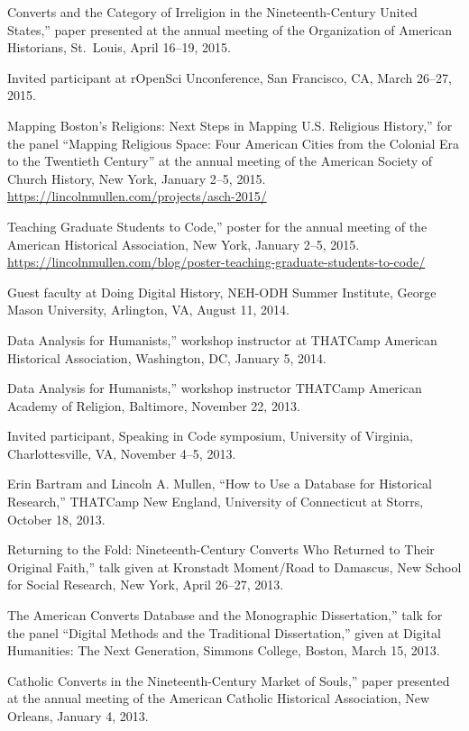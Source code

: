 \documentclass[11pt]{article}
\begin{document}
\noindent{}Converts and the Category of Irreligion in the Nineteenth-Century United States,'' paper presented at the annual meeting of the Organization of American Historians, St.~Louis, April 16--19, 2015.

Invited participant at rOpenSci Unconference, San Francisco, CA, March 26--27, 2015.

\noindent{}Mapping Boston's Religions: Next Steps in Mapping U.S. Religious History,'' for the panel ``Mapping Religious Space: Four American Cities from the Colonial Era to the Twentieth Century'' at the annual meeting of the American Society of Church History, New York, January 2--5, 2015.  
\url{https://lincolnmullen.com/projects/asch-2015/}

\noindent{}Teaching Graduate Students to Code,'' poster for the annual meeting of the American Historical Association, New York, January 2--5, 2015.  \url{https://lincolnmullen.com/blog/poster-teaching-graduate-students-to-code/}

Guest faculty at Doing Digital History, NEH-ODH Summer Institute, George Mason University, Arlington, VA, August 11, 2014.

\noindent{}Data Analysis for Humanists,'' workshop instructor at THATCamp American Historical Association, Washington, DC, January 5, 2014.

\noindent{}Data Analysis for Humanists,'' workshop instructor THATCamp American Academy of Religion, Baltimore, November 22, 2013.

Invited participant, Speaking in Code symposium, University of Virginia, Charlottesville, VA, November 4--5, 2013.

Erin Bartram and Lincoln A. Mullen, ``How to Use a Database for Historical Research,'' THATCamp New England, University of Connecticut at Storrs, October 18, 2013.

\noindent{}Returning to the Fold: Nineteenth-Century Converts Who Returned to Their Original Faith,'' talk given at Kronstadt Moment/Road to Damascus, New School for Social Research, New York, April 26--27, 2013.

\noindent{}The American Converts Database and the Monographic Dissertation,'' talk for the panel ``Digital Methods and the Traditional Dissertation,'' given at Digital Humanities: The Next Generation, Simmons College, Boston, March 15, 2013.

\noindent{}Catholic Converts in the Nineteenth-Century Market of Souls,'' paper presented at the annual meeting of the American Catholic Historical Association, New Orleans, January 4, 2013.
\end{document}
